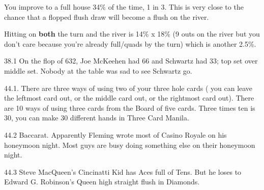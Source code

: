 You improve to a full house 34\% of the time, 1 in 3. This is very close
to the chance that a flopped flush draw will become a flush on the river.

Hitting on \textbf{both} the turn and the river is 14\% x 18\% (9 outs
on the river but you don't care because you're already full/quads by
the turn) which is another 2.5\%.

38.1 On the flop of 632, Joe McKeehen had 66 and Schwartz had 33; top
set over middle set. Nobody at the table was sad to see Schwartz go.

44.1. There are three ways of using two of your three hole
cards ( you can leave the leftmost card out, or the middle card out,
or the rightmost card out). There are 10 ways of using three cards
from the Board of five cards. Three times ten is 30, you can make 30
different hands in Three Card Manila.

44.2 Baccarat. Apparently Fleming wrote most of Casino Royale
on his honeymoon night. Most guys are busy doing something else
on their honeymoon night.

44.3 Steve MacQueen's Cincinatti Kid has Aces full of Tens. But he
loses to Edward G. Robinson's Queen high straight flush in Diamonds.
